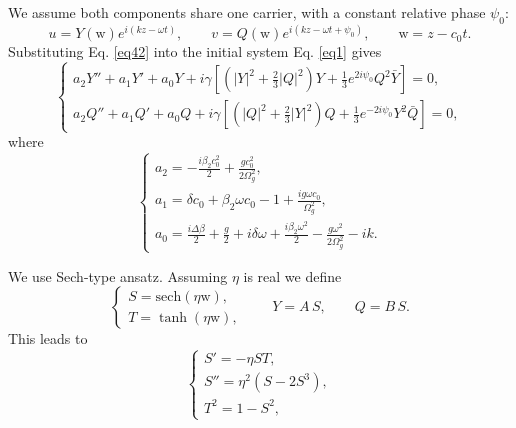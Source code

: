 \documentclass{article}
\begin{document}
            We assume both components share one carrier, with a constant relative phase $\psi_{0}$:
            \begin{equation} \label{eq42}
                u = Y\left(\mathrm{w}\right) e^{i\left(kz-\omega t\right)}, \qquad
                v = Q\left(\mathrm{w}\right) e^{i\left(kz-\omega t + \psi_{0}\right)}, \qquad
                \mathrm{w} = z - c_{0} t.
            \end{equation}
            Substituting Eq. \ref{eq42} into the initial system Eq. \ref{eq1} gives
            \begin{equation} \label{eq43}
                \begin{cases}
                    \displaystyle
                    a_2 Y'' + a_1 Y' + a_0 Y + i\gamma\left[\left(\left|Y\right|^2+\frac{2}{3}\left|Q\right|^2\right)Y + \frac{1}{3}e^{2i\psi_{0}}Q^2\bar Y\right] = 0, \\
                    \displaystyle
                    a_2 Q'' + a_1 Q' + a_0 Q + i\gamma\left[\left(\left|Q\right|^2+\frac{2}{3}\left|Y\right|^2\right)Q + \frac{1}{3}e^{-2i\psi_{0}}Y^2\bar Q\right] = 0,
                \end{cases}
            \end{equation}
            where
            \begin{equation} \label{eq44}
                \begin{cases}
                    \displaystyle a_2 = -\frac{i\beta_{2}c_0^2}{2} + \frac{g c_0^2}{2\Omega_g^2}, \\
                    \displaystyle a_1 = \delta c_0 + \beta_2\omega c_0 - 1 + \frac{i g\omega c_0}{\Omega_g^2}, \\
                    \displaystyle a_0 = \frac{i\Delta\beta}{2} + \frac{g}{2} + i\delta\omega + \frac{i\beta_2\omega^2}{2} - \frac{g\omega^2}{2\Omega_g^2} - ik.
                \end{cases}
            \end{equation}

            We use Sech-type ansatz. Assuming $\eta$ is real we define
            \begin{equation} \label{eq45}
                \begin{cases}
                    \displaystyle S = \mathrm{sech}\left(\eta\mathrm{w}\right), \\
                    \displaystyle T = \tanh\left(\eta\mathrm{w}\right),
                \end{cases}
                \qquad Y = A\,S, \qquad Q = B\,S.
            \end{equation}
            This leads to
            \begin{equation} \label{eq46}
                \begin{cases}
                    \displaystyle S' = -\eta ST, \\
                    \displaystyle S'' = \eta^2\left(S-2S^3\right), \\
                    \displaystyle T^2 = 1-S^2,
                \end{cases}
            \end{equation}
\end{document}
